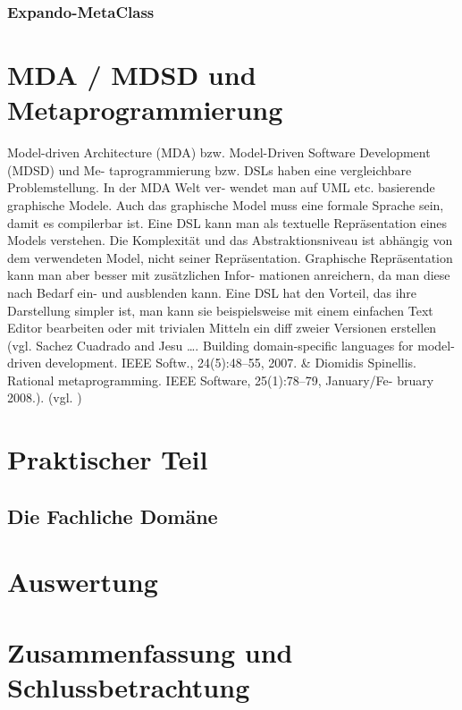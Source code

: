 \documentclass[11pt,english,ngerman, headsepline]{scrreprt}
\begin{document}
\subsection{Expando-MetaClass}


\chapter{MDA / MDSD und Metaprogrammierung} 
Model-driven Architecture (MDA) bzw. Model-Driven Software Development (MDSD)
und Me- taprogrammierung bzw. DSLs haben eine vergleichbare Problemstellung. In
der MDA Welt ver- wendet man auf UML etc. basierende graphische Modele. Auch das
graphische Model muss eine formale Sprache sein, damit es compilerbar ist. Eine
DSL kann man als textuelle Repräsentation eines Models verstehen.
Die Komplexität und das Abstraktionsniveau ist abhängig von dem verwendeten
Model, nicht seiner Repräsentation. Graphische Repräsentation kann man aber
besser mit zusätzlichen Infor- mationen anreichern, da man diese nach Bedarf
ein- und ausblenden kann.
Eine DSL hat den Vorteil, das ihre Darstellung simpler ist, man kann sie
beispielsweise mit einem einfachen Text Editor bearbeiten oder mit trivialen
Mitteln ein diff zweier Versionen erstellen (vgl. Sachez Cuadrado and
Jesu \ldots. Building domain-specific languages for model-driven
development. IEEE Softw., 24(5):48–55, 2007. \& Diomidis Spinellis. Rational
metaprogramming. IEEE Software, 25(1):78–79, January/Fe- bruary 2008.).
 (vgl. \cite{biekermetaprogrammierung})
 
\chapter{Praktischer Teil}

\section{Die Fachliche Domäne}

\chapter{Auswertung}

\chapter{Zusammenfassung und Schlussbetrachtung}

 

\clearpage{}
\appendix
\renewcommand{\theequation}{A-\arabic{equation}}

\setcounter{equation}{0}  %




\end{document}
